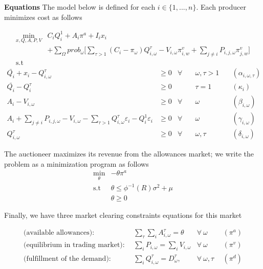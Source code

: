 \documentclass[11pt, letterpaper]{article}
\begin{document}
\begin{flushleft}
\hspace{0.5cm}

\textbf{Equations}
\smallskip
The model below is defined for each $i \in \{ 1,...,n\}$. Each producer minimizes cost as follows

\begin{align} \label{eq:simplemodel}
    \min_{x,Q,A,P,V} & C_iQ_i^{1} + A_i \pi^{a} + I_i x_i \nonumber\\
    & + \sum_{\Omega} prob_\omega \Big[ \sum_{\tau>1} (C_i-\pi_{\omega}) Q_{i,\omega}^{\tau}- V_{i,\omega}\pi_{i,w}^v+\sum_{j\neq i} P_{i,j,\omega}\pi_{j,w}^v\Big]\\
     \textrm{s.t \ } \nonumber
\end{align}
\begin{align}
    \bar{Q_i} + x_{i} - Q_{i,\omega}^{\tau} & \geq 0  & \forall & \quad \omega, \tau  > 1 & \quad (\alpha_{i,\omega,\tau}) \\
    \bar{Q_i}-Q_{i}^{\tau} & \geq 0  &  & \quad \tau  =1 & \quad (\kappa_i) \\
 A_{i} -V_{i,\omega} & \geq  0  & \forall & \quad \omega & \quad (\beta_{i,\omega})\\
 A_{i} + \sum_{j \neq i}P_{i,j,\omega} - V_{i,\omega}-\sum_{\tau>1}Q_{i, \omega}^{\tau}\varepsilon_{i}-Q_i^{1}\varepsilon_{i} & \geq  0  &\forall & \quad \omega & \quad (\gamma_{i,\omega})\\
 Q_{i, \omega}^{\tau} & \geq  0   & \forall & \quad \omega, \tau & \quad (\delta_{i,\omega})
\end{align}

\smallskip
The auctioneer maximizes its revenue from the allowances market; we write the problem as a minimization program as follows
\begin{align}
    \min_{\theta} & -\theta \pi^{a} \\
    \textrm{s.t \ } & \theta \leq \phi^{-1}(R) \sigma^2 + \mu \\
    &\theta \geq 0
\end{align}

\smallskip

Finally, we have three market clearing constraints equations for this market

\begin{align}
\textrm{(available allowances)}: &  \ \   \sum_{\tau} \sum_{i} A^{\tau}_{i,\omega} = \theta   & \forall \ \omega & \ \  (\pi^{a})\\
\textrm{(equilibrium in trading market)}: &   \ \  \sum_{i} P_{i,\omega} = \sum_{i} V_{i,\omega} & \forall \ \omega & \ \ (\pi^{v}) \\
\textrm{(fulfillment of the demand)}:  &   \ \  \sum_{i} Q^{\tau}_{i,\omega} = D^{\tau}_{\omega}, & \forall \ \omega, \tau & \ \ (\pi^{d})
\end{align}

\end{flushleft}
\end{document}
